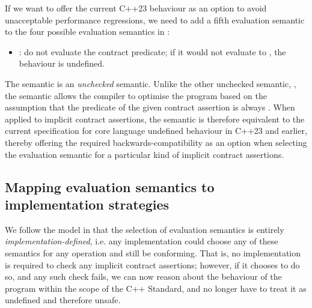 If we want to offer the current C++23 behaviour as an option to avoid unacceptable performance regressions, we need to add a fifth evaluation semantic to the four possible evaluation semantics in \cite{P2900R7}:
\begin{itemize}
\item {}: do not evaluate the contract predicate; if it would not evaluate to , the behaviour is undefined.
\end{itemize}
The  semantic is an \emph{unchecked} semantic. Unlike the other unchecked semantic, , the  semantic allows the compiler to optimise the program based on the assumption that the predicate of the given contract assertion is always . When applied to implicit contract assertions, the  semantic is therefore equivalent to the current specification for core language undefined behaviour in C++23 and earlier, thereby offering the required backwards-compatibility as an option when selecting the evaluation semantic for a particular kind of implicit contract assertions.

\subsection{Mapping evaluation semantics to implementation strategies}

We follow the model in \cite{P2900R7} that the selection of evaluation semantics is entirely \emph{implementation-defined}, i.e. any implementation could choose any of these semantics for any operation and still be conforming. That is, no implementation is required to check any implicit contract assertions; however, if it chooses to do so, and any such check fails, we can now reason about the behaviour of the program within the scope of the C++ Standard, and no longer have to treat it as undefined and therefore unsafe.

